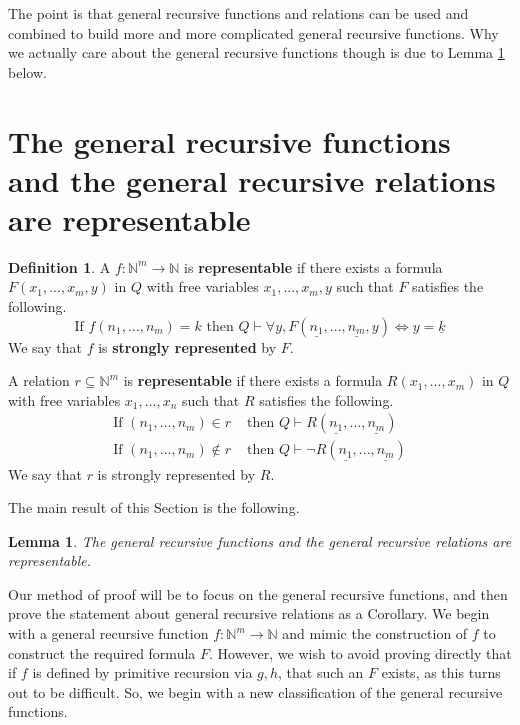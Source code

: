 \documentclass[12pt]{article}
\theoremstyle{plain}
\newtheorem{lemma}[thm]{Lemma}
\theoremstyle{definition}
\newtheorem{defn}[thm]{Definition} %
\newcommand{\bb}[1]{\mathbb{#1}}
\newcommand{\lto}{\longrightarrow}
\begin{document}
	The point is that general recursive functions and relations can be used and combined to build more and more complicated general recursive functions. Why we actually care about the general recursive functions though is due to Lemma \ref{lem:strongly_representable} below.
	
	\section{The general recursive functions and the general recursive relations are representable}
	\begin{defn}
		A $f:\bb{N}^m \lto \bb{N}$ is \textbf{representable} if there exists a formula $F(x_1,...,x_m,y)$ in $Q$ with free variables $x_1,...,x_m,y$ such that $F$ satisfies the following.
		\begin{equation}
			\text{If }f(n_1,...,n_m) = k \text{ then }Q\vdash \forall y, F(\underline{n_1},...,\underline{n_m},y)\Longleftrightarrow y = \underline{k}
		\end{equation}
		We say that $f$ is \textbf{strongly represented} by $F$.
		
		A relation $r \subseteq \bb{N}^m$ is \textbf{representable} if there exists a formula $R(x_1,...,x_m)$ in $Q$ with free variables $x_1,...,x_n$ such that $R$ satisfies the following.
		\begin{align*}
			\text{If }(n_1,...,n_m) \in r &\text{ then }Q\vdash R(\underline{n_1},...,\underline{n_m})\\
			\text{If }(n_1,...,n_m) \not\in r &\text{ then }Q\vdash\neg R(\underline{n_1},...,\underline{n_m})
		\end{align*}
		We say that $r$ is strongly represented by $R$.
	\end{defn}
	The main result of this Section is the following.
	\begin{lemma}\label{lem:strongly_representable}
		The general recursive functions and the general recursive relations are representable.
	\end{lemma}
	Our method of proof will be to focus on the general recursive functions, and then prove the statement about general recursive relations as a Corollary. We begin with a general recursive function $f:\bb{N}^m \lto \bb{N}$ and mimic the construction of $f$ to construct the required formula $F$. However, we wish to avoid proving directly that if $f$ is defined by primitive recursion via $g,h$, that such an $F$ exists, as this turns out to be difficult. So, we begin with a new classification of the general recursive functions.
\end{document}

